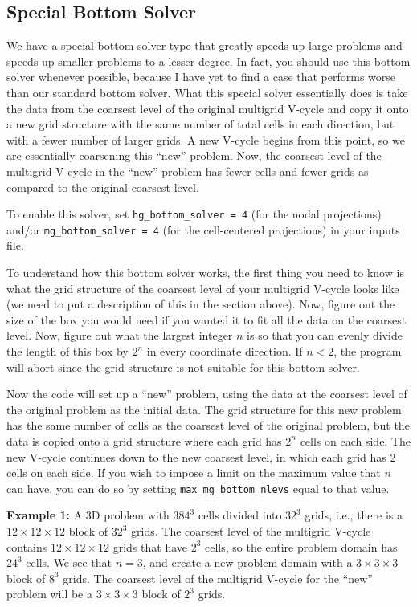 \subsection{Special Bottom Solver}
We have a special bottom solver type that greatly speeds up large problems
and speeds up smaller problems to a lesser degree.
In fact, you should use this bottom solver whenever possible, because I
have yet to find a case that performs worse than our standard bottom solver.
What this special solver essentially does is take the data from the coarsest 
level of the original multigrid V-cycle and copy it onto a new grid structure 
with the same number of total cells in each direction, but with a fewer number of larger 
grids.  A new V-cycle begins from this point, 
so we are essentially coarsening this ``new'' problem.
Now, the coarsest level of the multigrid V-cycle in the ``new'' problem has 
fewer cells and fewer grids as compared to the original coarsest level.

To enable this solver, set {\tt hg\_bottom\_solver = 4} (for the nodal
projections) and/or {\tt mg\_bottom\_solver = 4} (for the cell-centered
projections) in your inputs file.

To understand how this bottom solver works, the first thing you need to know
is what the grid structure of the coarsest level of your multigrid V-cycle
looks like (we need to put a description of this in the section above).
Now, figure out the size of the box you would need if you
wanted it to fit all the data on the coarsest level.  Now, figure out what
the largest integer $n$ is so that you can evenly divide the length of this box
by $2^n$ in every coordinate direction.  If $n < 2$, the program will abort
since the grid structure is not suitable for this bottom solver.

Now the code will set up a ``new'' problem, using the data at the coarsest level
of the original problem as the initial data.  The grid structure for this new
problem has the same number of cells as the coarsest level of the original problem,
but the data is copied onto a grid structure where each grid has $2^n$ cells
on each side.  The new V-cycle continues down to the new coarsest level, in
which each grid has 2 cells on each side.  If you wish to impose a limit on
the maximum value that $n$ can have, you can do so by setting 
{\tt max\_mg\_bottom\_nlevs} equal to that value.

{\bf Example 1:} A 3D problem with $384^3$ cells divided into $32^3$ grids, i.e., 
there is a $12\times 12\times 12$ block of $32^3$ grids.  The coarsest level of the 
multigrid V-cycle contains $12\times 12\times 12$ grids that have $2^3$ cells, so the 
entire problem domain has $24^3$ cells.  We see that $n=3$, and create a new problem 
domain with a $3\times 3\times 3$ block of $8^3$ grids.  The coarsest level of the 
multigrid V-cycle for the ``new'' problem will be a $3\times 3\times 3$ block of 
$2^3$ grids.

